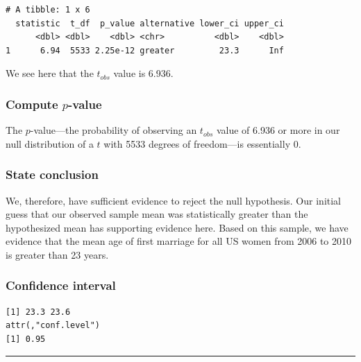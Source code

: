\documentclass[12pt,]{krantz}
\makeatletter
\newenvironment{Shaded}{\begin{snugshade}}{\end{snugshade}}
\newcommand{\KeywordTok}[1]{\textcolor[rgb]{0.27,0.27,0.27}{\textbf{#1}}}
\newcommand{\DataTypeTok}[1]{\textcolor[rgb]{0.27,0.27,0.27}{#1}}
\newcommand{\DecValTok}[1]{\textcolor[rgb]{0.06,0.06,0.06}{#1}}
\newcommand{\StringTok}[1]{\textcolor[rgb]{0.5,0.5,0.5}{#1}}
\newcommand{\OperatorTok}[1]{\textcolor[rgb]{0.43,0.43,0.43}{\textbf{#1}}}
\newcommand{\NormalTok}[1]{#1}
\newenvironment{kframe}{%
\medskip{}
\setlength{\fboxsep}{.8em}
 \def\at@end@of@kframe{}%
 \ifinner\ifhmode%
  \def\at@end@of@kframe{\end{minipage}}%
  \begin{minipage}{\columnwidth}%
 \fi\fi%
 \def\FrameCommand##1{\hskip\@totalleftmargin \hskip-\fboxsep
 \colorbox{shadecolor}{##1}\hskip-\fboxsep
     \hskip-\linewidth \hskip-\@totalleftmargin \hskip\columnwidth}%
 \MakeFramed {\advance\hsize-\width
   \@totalleftmargin\z@ \linewidth\hsize
   \@setminipage}}%
 {\par\unskip\endMakeFramed%
 \at@end@of@kframe}
\renewenvironment{Shaded}{\begin{kframe}}{\end{kframe}}
\theoremstyle{definition}
\theoremstyle{definition}
\theoremstyle{definition}
\theoremstyle{remark}
\makeatother
\begin{document}
\begin{verbatim}
# A tibble: 1 x 6
  statistic  t_df  p_value alternative lower_ci upper_ci
      <dbl> <dbl>    <dbl> <chr>          <dbl>    <dbl>
1      6.94  5533 2.25e-12 greater         23.3      Inf
\end{verbatim}

We see here that the \(t_{obs}\) value is 6.936.

\subsubsection*{\texorpdfstring{Compute
\(p\)-value}{Compute p-value}}\label{compute-p-value}


The \(p\)-value---the probability of observing an \(t_{obs}\) value of
6.936 or more in our null distribution of a \(t\) with 5533 degrees of
freedom---is essentially 0.

\subsubsection*{State conclusion}\label{state-conclusion}


We, therefore, have sufficient evidence to reject the null hypothesis.
Our initial guess that our observed sample mean was statistically
greater than the hypothesized mean has supporting evidence here. Based
on this sample, we have evidence that the mean age of first marriage for
all US women from 2006 to 2010 is greater than 23 years.

\subsubsection*{Confidence interval}\label{confidence-interval}


\begin{Shaded}
\end{Shaded}

\begin{verbatim}
[1] 23.3 23.6
attr(,"conf.level")
[1] 0.95
\end{verbatim}

\begin{center}\rule{0.5\linewidth}{\linethickness}\end{center}
\end{document}
